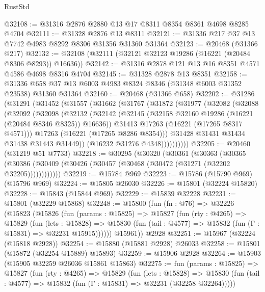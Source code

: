 \begin{lexlean}{RustStd}
\begin{coremodule}
@32108 := @31316 @2876 @2880 @13 @17 @8311 @8354 @8361 @4698 @8285 @4704
@32111 := @31328 @2876 @13 @8311
@32121 := @31336 @217 @37 @13 @7742 @4983 @8292 @8306 @31356 @31360 @31364
@32123 := @20468 (@31366 @217)
@32132 := @32108 (@32111 (@32121 @32123 @19286 (@16221 (@20484 @8306 @8293)) @16636))
@32142 := @31316 @2878 @121 @13 @16 @8351 @4571 @4586 @4698 @8316 @4704
@32145 := @31328 @2878 @13 @8351
@32158 := @31336 @658 @37 @13 @6003 @4983 @8324 @8346 (@31348 @6003 @31352 @23538) @31360 @31364
@32160 := @20468 (@31366 @658)
@32202 := @31286
    (@31291
      (@31452
        (@31557
          (@31662
            (@31767
              (@31872
                (@31977
                  (@32082
                    (@32088
                      (@32092
                        (@32098
                          (@32132
                            (@32142
                              (@32145 (@32158 @32160 @19286 (@16221 (@20484 @8346 @8325)) @16636))
                              @31413
                              @17263
                              (@16221 (@17265 @8317 @4571)))
                            @17263
                            (@16221 (@17265 @8286 @8354)))
                          @31428
                          @31431
                          @31434
                          @31438
                          @31443
                          @31449))
                      (@16232 @31276 @4348))))))))))
@32205 := @20460 (@31219 @51 @7733)
@32218 := @30295
    (@30320
      (@30361
        (@30363
          (@30365 (@30386 (@30409 (@30426 (@30457 (@30468 (@30472 (@31271 (@32202 @32205))))))))))))
@32219 := @15784 @969
@32223 := @15786 (@15790 @969) (@15796 @969)
@32224 := @15805 @26030
@32226 := @15801 (@32224 @15820)
@32228 := @15843 (@15844 @969)
@32229 := @15839 @32228
@32231 := @15801 (@32229 @15868)
@32248 := @15800
    (fun (fn : @76) =>
    @32226
      (@15823
        (@15826
          (fun (params : @15825) =>
          @15827
            (fun (rty : @4265) =>
            @15829
              (fun (lets : @15828) =>
              @15830 (fun (tail : @4577) => @15832 (fun (Γ : @15831) => @32231 @15915))))))
        @15961))
    @2928
@32251 := @15967 (@32224 (@15818 @2928))
@32254 := @15880 (@15881 @2928) @26033
@32258 := @15801 (@15872 (@32254 @15889) @15893)
@32259 := @15906 @2928
@32264 := @15903 (@15905 @32259 @26036 @15861 @15863)
@32275 := fun (params : @15825) =>
  @15827
    (fun (rty : @4265) =>
    @15829
      (fun (lets : @15828) =>
      @15830 (fun (tail : @4577) => @15832 (fun (Γ : @15831) => @32231 (@32258 @32264)))))

\end{coremodule}
\end{lexlean}

